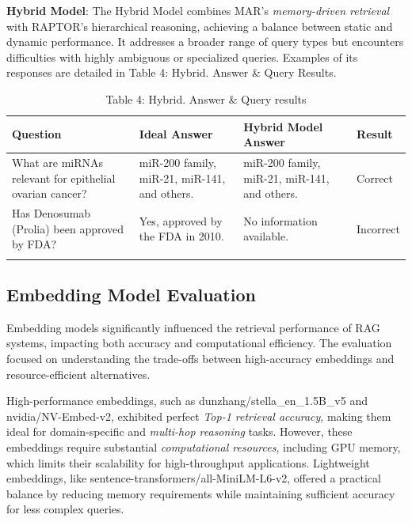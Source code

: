 \documentclass[pdflatex,sn-mathphys-num]{sn-jnl}%
\begin{document}
\textbf{Hybrid Model}: The Hybrid Model combines MAR’s \emph{memory-driven retrieval} with RAPTOR’s hierarchical reasoning, achieving a balance between static and dynamic performance. It addresses a broader range of query types but encounters difficulties with highly ambiguous or specialized queries. Examples of its responses are detailed in Table 4: Hybrid. Answer \& Query Results.
\begin{table}[h]
\caption{Table 4: Hybrid. Answer \& Query results
}\label{tab:hybrid_model_results}%
\begin{tabular}{@{}p{}p{}p{}p{}@{}}
\toprule
\textbf{Question} & \textbf{Ideal Answer} & \textbf{Hybrid Model Answer} & \textbf{Result} \\
\midrule
What are miRNAs relevant for epithelial ovarian cancer? & miR-200 family, miR-21, miR-141, and others. & miR-200 family, miR-21, miR-141, and others. & Correct \\
Has Denosumab (Prolia) been approved by FDA? & Yes, approved by the FDA in 2010. & No information available. & Incorrect \\
\botrule
\end{tabular}
\end{table}


\subsection{Embedding Model Evaluation}\label{subsec2}
Embedding models significantly influenced the retrieval performance of RAG systems, impacting both accuracy and computational efficiency. The evaluation focused on understanding the trade-offs between high-accuracy embeddings and resource-efficient alternatives.

High-performance embeddings, such as dunzhang/stella\_en\_1.5B\_v5 and nvidia/NV-Embed-v2, exhibited perfect \emph{Top-1 retrieval accuracy}, making them ideal for domain-specific and \emph{multi-hop reasoning} tasks. However, these embeddings require substantial \emph{computational resources}, including GPU memory, which limits their scalability for high-throughput applications. Lightweight embeddings, like sentence-transformers/all-MiniLM-L6-v2, offered a practical balance by reducing memory requirements while maintaining sufficient accuracy for less complex queries.
\end{document}
